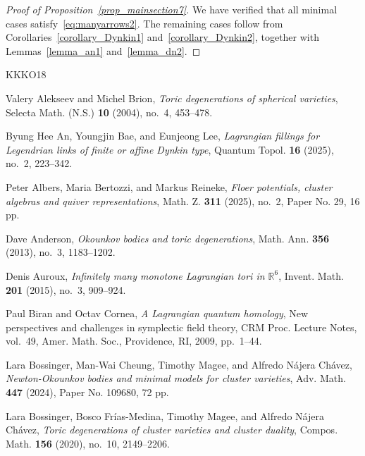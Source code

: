 \documentclass[11pt]{amsart}
\numberwithin{equation}{section}
\theoremstyle{plain}
\theoremstyle{definition}
\numberwithin{equation}{section}
\begin{document}
\begin{proof}[Proof of Proposition~\ref{prop_mainsection7}]
We have verified that all minimal cases satisfy~\eqref{eq:manyarrows2}.  
The remaining cases follow from Corollaries~\ref{corollary_Dynkin1} and~\ref{corollary_Dynkin2}, together with Lemmas~\ref{lemma_an1} and~\ref{lemma_dn2}.  
\end{proof}


%
%

\providecommand{\bysame}{\leavevmode\hbox to3em{\hrulefill}\thinspace}
\providecommand{\MR}{\relax\ifhmode\unskip\space\fi MR }
\providecommand{\MRhref}[2]{%
  \href{http://www.ams.org/mathscinet-getitem?mr=#1}{#2}
}
\providecommand{\href}[2]{#2}
\begin{thebibliography}{KKKO18}

Valery Alekseev and Michel Brion, \emph{Toric degenerations of spherical varieties}, Selecta Math. (N.S.) {\bf 10} (2004), no.~4, 453--478.

Byung Hee An, Youngjin Bae, and Eunjeong Lee, \emph{Lagrangian fillings for Legendrian links of finite or affine Dynkin type}, Quantum Topol. {\bf 16} (2025), no.~2, 223--342.

Peter Albers, Maria Bertozzi, and Markus Reineke, \emph{Floer potentials, cluster algebras and quiver representations}, Math. Z. {\bf 311} (2025), no.~2, Paper No. 29, 16 pp.

Dave Anderson, \emph{Okounkov bodies and toric degenerations}, Math. Ann.
  \textbf{356} (2013), no.~3, 1183--1202. 

Denis Auroux, \emph{Infinitely many monotone {L}agrangian tori in
  {$\mathbb{R}^6$}}, Invent. Math. \textbf{201} (2015), no.~3, 909--924.
  
Paul Biran and Octav Cornea, \emph{A {L}agrangian quantum homology}, New
  perspectives and challenges in symplectic field theory, CRM Proc. Lecture
  Notes, vol.~49, Amer. Math. Soc., Providence, RI, 2009, pp.~1--44.
  
Lara Bossinger, Man-Wai Cheung, Timothy Magee, and Alfredo N\'ajera Ch\'avez, 
\emph{Newton-{O}kounkov bodies and minimal models for cluster varieties}, Adv. Math. {\bf 447} (2024), Paper No. 109680, 72 pp.

Lara Bossinger, Bosco Fr\'{i}as-Medina, Timothy Magee, and Alfredo N\'ajera Ch\'avez, 
\emph{Toric degenerations of cluster varieties and cluster duality}, Compos. Math. {\bf 156} (2020), no.~10, 2149--2206.


\end{thebibliography}
\end{document}
